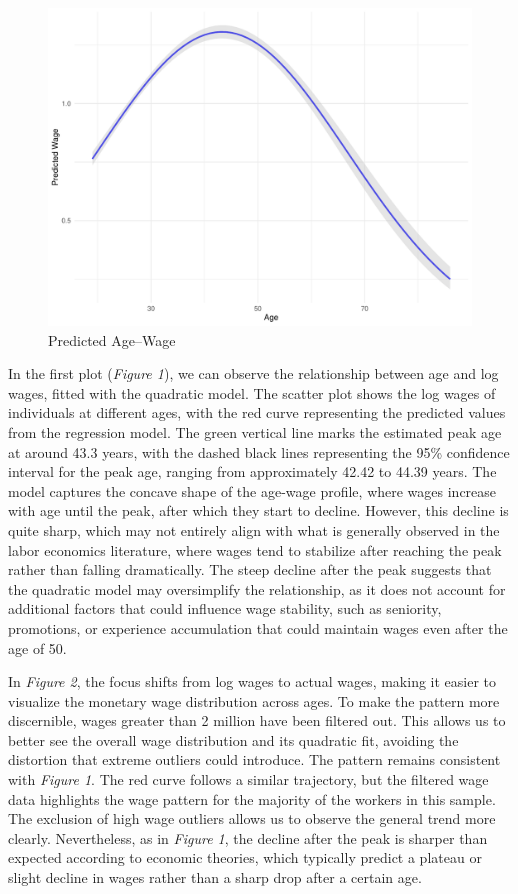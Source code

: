 \documentclass[11pt,a4paper,onecolumn]{article}
\begin{document}
    \begin{figure}[H]
        \includegraphics[scale=0.6]{../views/P3_age_wage_profile2.pdf}   
        \caption{Predicted Age--Wage } \label{fig:P3}
    \end{figure}

    In the first plot (\textit{Figure 1}), we can observe the relationship between age and log wages, fitted with the quadratic model. The scatter plot shows the log wages of individuals at different ages, with the red curve representing the predicted values from the regression model. The green vertical line marks the estimated peak age at around 43.3 years, with the dashed black lines representing the 95\% confidence interval for the peak age, ranging from approximately 42.42 to 44.39 years. The model captures the concave shape of the age-wage profile, where wages increase with age until the peak, after which they start to decline. However, this decline is quite sharp, which may not entirely align with what is generally observed in the labor economics literature, where wages tend to stabilize after reaching the peak rather than falling dramatically. The steep decline after the peak suggests that the quadratic model may oversimplify the relationship, as it does not account for additional factors that could influence wage stability, such as seniority, promotions, or experience accumulation that could maintain wages even after the age of 50.

    In \textit{Figure 2}, the focus shifts from log wages to actual wages, making it easier to visualize the monetary wage distribution across ages. To make the pattern more discernible, wages greater than 2 million have been filtered out. This allows us to better see the overall wage distribution and its quadratic fit, avoiding the distortion that extreme outliers could introduce. The pattern remains consistent with \textit{Figure 1}. The red curve follows a similar trajectory, but the filtered wage data highlights the wage pattern for the majority of the workers in this sample. The exclusion of high wage outliers allows us to observe the general trend more clearly. Nevertheless, as in \textit{Figure 1}, the decline after the peak is sharper than expected according to economic theories, which typically predict a plateau or slight decline in wages rather than a sharp drop after a certain age.
    
\end{document}

